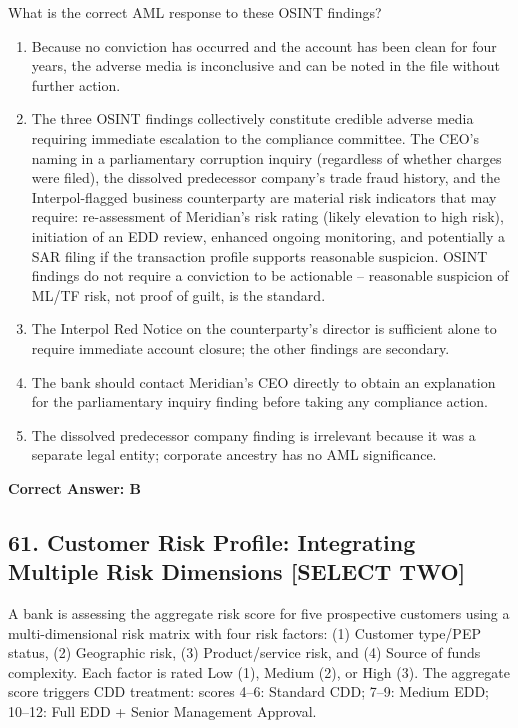 \documentclass[11pt,a4paper]{article}
\begin{document}
	What is the correct AML response to these OSINT findings?
	
	\begin{enumerate}[label=\Alph*.]
		\item Because no conviction has occurred and the account has been clean for four years, the adverse media is inconclusive and can be noted in the file without further action.
		\item The three OSINT findings collectively constitute credible adverse media requiring immediate escalation to the compliance committee. The CEO's naming in a parliamentary corruption inquiry (regardless of whether charges were filed), the dissolved predecessor company's trade fraud history, and the Interpol-flagged business counterparty are material risk indicators that may require: re-assessment of Meridian's risk rating (likely elevation to high risk), initiation of an EDD review, enhanced ongoing monitoring, and potentially a SAR filing if the transaction profile supports reasonable suspicion. OSINT findings do not require a conviction to be actionable -- reasonable suspicion of ML/TF risk, not proof of guilt, is the standard.
		\item The Interpol Red Notice on the counterparty's director is sufficient alone to require immediate account closure; the other findings are secondary.
		\item The bank should contact Meridian's CEO directly to obtain an explanation for the parliamentary inquiry finding before taking any compliance action.
		\item The dissolved predecessor company finding is irrelevant because it was a separate legal entity; corporate ancestry has no AML significance.
	\end{enumerate}
	\textbf{Correct Answer: B}
	
	\subsection{61. Customer Risk Profile: Integrating Multiple Risk Dimensions \textnormal{[SELECT TWO]}}
	
	A bank is assessing the aggregate risk score for five prospective customers using a multi-dimensional risk matrix with four risk factors: (1) Customer type/PEP status, (2) Geographic risk, (3) Product/service risk, and (4) Source of funds complexity. Each factor is rated Low (1), Medium (2), or High (3). The aggregate score triggers CDD treatment: scores 4--6: Standard CDD; 7--9: Medium EDD; 10--12: Full EDD + Senior Management Approval.
	
\end{document}
